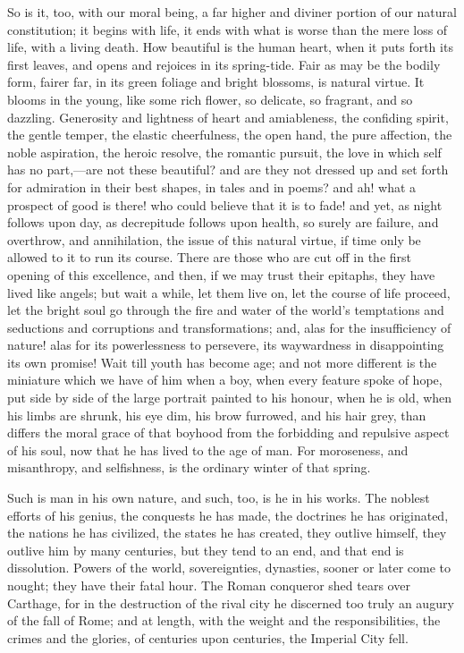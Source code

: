 So is it, too, with our moral being, a far higher and
diviner portion of our natural constitution; it begins
with life, it ends with what is worse than the mere loss
of life, with a living death. How beautiful is the human
heart, when it puts forth its first leaves, and opens and
rejoices in its spring-tide. Fair as may be the bodily
form, fairer far, in its green foliage and bright
blossoms, is natural virtue. It blooms in the young, like
some rich flower, so delicate, so fragrant, and so
dazzling. Generosity and lightness of heart and
amiableness, the confiding spirit, the gentle temper, the
elastic cheerfulness, the open hand, the pure affection,
the noble aspiration, the heroic resolve, the romantic
pursuit, the love in which self has no part,—are not
these beautiful? and are they not dressed up and set
forth for admiration in their best shapes, in tales and
in poems? and ah! what a prospect of good is there! who
could believe that it is to fade! and yet, as night
follows upon day, as decrepitude follows upon health, so
surely are failure, and overthrow, and annihilation, the
issue of this natural virtue, if time only be allowed to
it to run its course. There are those who are cut off in
the first opening of this excellence, and then, if we may
trust their epitaphs, they have lived like angels; but
wait a while, let them live on, let the course of life
proceed, let the bright soul go through the fire and
water of the world's temptations and seductions and
corruptions and transformations; and, alas for the
insufficiency of nature! alas for its powerlessness to
persevere, its waywardness in disappointing its own
promise! Wait till youth has become age; and not more
different is the miniature which we have of him when a
boy, when every feature spoke of hope, put side by side
of the large portrait painted to his honour, when he is
old, when his limbs are shrunk, his eye dim, his brow
furrowed, and his hair grey, than differs the moral grace
of that boyhood from the forbidding and repulsive aspect
of his soul, now that he has lived to the age of man. For
moroseness, and misanthropy, and selfishness, is the
ordinary winter of that spring.

Such is man in his own nature, and such, too, is he in
his works. The noblest efforts of his genius, the
conquests he has made, the doctrines he has originated,
the nations he has civilized, the states he has created,
they outlive himself, they outlive him by many centuries,
but they tend to an end, and that end is dissolution.
Powers of the world, sovereignties, dynasties, sooner or
later come to nought; they have their fatal hour. The
Roman conqueror shed tears over Carthage, for in the
destruction of the rival city he discerned too truly an
augury of the fall of Rome; and at length, with the
weight and the responsibilities, the crimes and the
glories, of centuries upon centuries, the Imperial City
fell.

